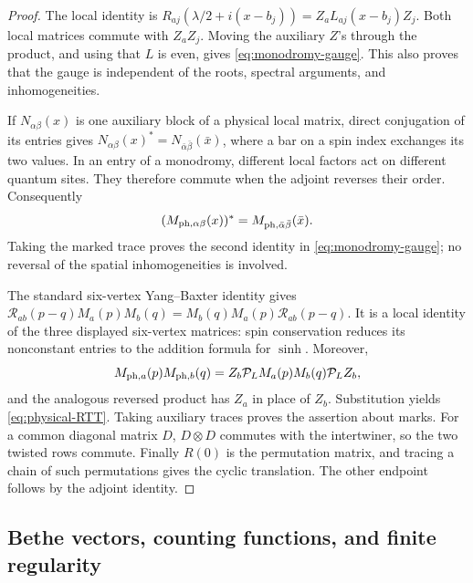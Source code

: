 \begin{proof}
The local identity is
$R_{aj}(\lambda/2+i(x-b_j))=Z_aL_{aj}(x-b_j)Z_j$.
Both local matrices commute with $Z_aZ_j$.  Moving the auxiliary $Z$'s
through the product, and using that $L$ is even, gives
\eqref{eq:monodromy-gauge}.  This also proves that the gauge is
independent of the roots, spectral arguments, and inhomogeneities.

If $N_{\alpha\beta}(x)$ is one auxiliary block of a physical local
matrix, direct conjugation of its entries gives
$N_{\alpha\beta}(x)^*=N_{\bar\alpha\bar\beta}(\bar x)$, where a bar on
a spin index exchanges its two values.  In an entry of a monodromy,
different local factors act on different quantum sites.  They therefore
commute when the adjoint reverses their order.  Consequently
\[
 (M_{{\rm ph},\alpha\beta}(x))^*
 =M_{{\rm ph},\bar\alpha\bar\beta}(\bar x).
\]
Taking the marked trace proves the second identity in
\eqref{eq:monodromy-gauge}; no reversal of the spatial inhomogeneities
is involved.

The standard six-vertex Yang--Baxter identity gives
$\mathcal R_{ab}(p-q)M_a(p)M_b(q)
=M_b(q)M_a(p)\mathcal R_{ab}(p-q)$.
It is a local identity of the three displayed six-vertex matrices:
spin conservation reduces its nonconstant entries to the addition
formula for $\sinh$.  Moreover,
\[
 M_{{\rm ph},a}(p)M_{{\rm ph},b}(q)
 =Z_b\mathcal P_L M_a(p)M_b(q)\mathcal P_L Z_b,
\]
and the analogous reversed product has $Z_a$ in place of $Z_b$.
Substitution yields \eqref{eq:physical-RTT}.  Taking auxiliary traces
proves the assertion about marks.  For a common diagonal matrix $D$,
$D\otimes D$ commutes with the intertwiner, so the two twisted rows
commute.  Finally $R(0)$ is the permutation matrix, and tracing a chain
of such permutations gives the cyclic translation.  The other endpoint
follows by the adjoint identity.
\end{proof}

\subsection{Bethe vectors, counting functions, and finite regularity}

